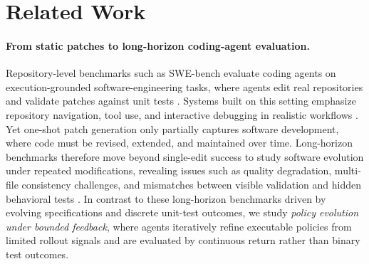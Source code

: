 \section{Related Work}
\paragraph{From static patches to long-horizon coding-agent evaluation.}

Repository-level benchmarks such as SWE-bench evaluate coding agents on execution-grounded software-engineering tasks, where agents edit real repositories and validate patches against unit tests \citep{swebench}. 
Systems built on this setting emphasize repository navigation, tool use, and interactive debugging in realistic workflows \citep{sweagent,codeact,openhands}. Yet one-shot patch generation only partially captures software development, where code must be revised, extended, and maintained over time. Long-horizon benchmarks therefore move beyond single-edit success to study software evolution under repeated modifications, revealing issues such as quality degradation, multi-file consistency challenges, and mismatches between visible validation and hidden behavioral tests \citep{slopcodebench,sweci,sweevo,roadmapbench,specbench}. In contrast to these long-horizon benchmarks driven by evolving specifications and discrete unit-test outcomes, we study \emph{policy evolution under bounded feedback}, where agents iteratively refine executable policies from limited rollout signals and are evaluated by continuous return rather than binary test outcomes.




